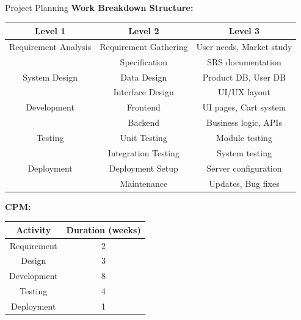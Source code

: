 \documentclass[11pt]{beamer}
\begin{document}
    \begin{frame}[t, allowframebreaks]{Project Planning}
        \textbf{Work Breakdown Structure:}\\[10pt]

        \vfill
        \small
        \begin{tabular}{|c|c|c|}
            \hline
            \textbf{Level 1}     & \textbf{Level 2}      & \textbf{Level 3}         \\
            \hline

            Requirement Analysis & Requirement Gathering & User needs, Market study \\
            & Specification         & SRS documentation        \\
            \hline

            System Design        & Data Design           & Product DB, User DB      \\
            & Interface Design      & UI/UX layout             \\
            \hline

            Development          & Frontend              & UI pages, Cart system    \\
            & Backend               & Business logic, APIs     \\
            \hline

            Testing              & Unit Testing          & Module testing           \\
            & Integration Testing   & System testing           \\
            \hline

            Deployment           & Deployment Setup      & Server configuration     \\
            & Maintenance           & Updates, Bug fixes       \\
            \hline

        \end{tabular}
        \vfill

        \framebreak

        \textbf{CPM:}\\[10pt]


        \begin{tabular}{|c|c|}
            \hline
            \textbf{Activity} & \textbf{Duration (weeks)} \\
            \hline
            Requirement       & 2                         \\
            \hline
            Design            & 3                         \\
            \hline
            Development       & 8                         \\
            \hline
            Testing           & 4                         \\
            \hline
            Deployment        & 1                         \\
            \hline
        \end{tabular}


\end{frame}
\end{document}
